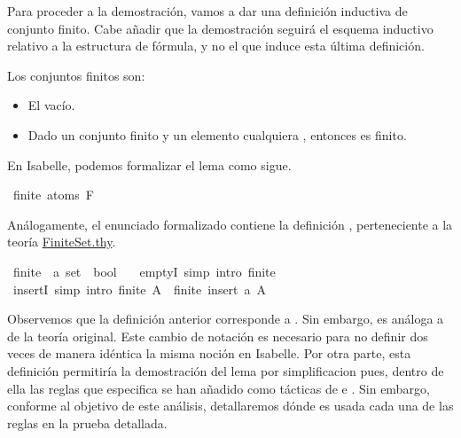 \begin{isabellebody}
\begin{isamarkuptext}
  Para proceder a la demostración, vamos a dar una definición inductiva 
  de conjunto finito. Cabe añadir que la demostración seguirá el esquema 
  inductivo relativo a la estructura de fórmula, y no el que induce esta
  última definición.

  \begin{definicion}
    Los conjuntos finitos son:
      \begin{itemize}
        \item El vacío.
        \item Dado un conjunto finito  y un elemento cualquiera , 
          entonces  es finito.
      \end{itemize}
  \end{definicion}

  En Isabelle, podemos formalizar el lema como sigue.%
\end{isamarkuptext}\isamarkuptrue%
\isamarkupfalse%
\ {\isachardoublequoteopen}finite\ {\isacharparenleft}atoms\ F{\isacharparenright}{\isachardoublequoteclose}\isanewline
%
\isadelimproof
\ \ %
\endisadelimproof
%
\isatagproof
{}\isamarkupfalse%
%
\endisatagproof
{\isafoldproof}%
%
\isadelimproof
%
\endisadelimproof
%
\begin{isamarkuptext}%
Análogamente, el enunciado formalizado contiene la definición 
  , perteneciente a la teoría 
  \href{https://n9.cl/x86r}{FiniteSet.thy}.%
\end{isamarkuptext}\isamarkuptrue%
\isamarkupfalse%
\ finite{\isacharprime}\ {\isacharcolon}{\isacharcolon}\ {\isachardoublequoteopen}{\isacharprime}a\ set\ {\isasymRightarrow}\ bool{\isachardoublequoteclose}\ \isanewline
\ \ emptyI{\isacharprime}\ {\isacharbrackleft}simp{\isacharcomma}\ intro{\isacharbang}{\isacharbrackright}{\isacharcolon}\ {\isachardoublequoteopen}finite{\isacharprime}\ {\isacharbraceleft}{\isacharbraceright}{\isachardoublequoteclose}\isanewline
{\isacharbar}\ insertI{\isacharprime}\ {\isacharbrackleft}simp{\isacharcomma}\ intro{\isacharbang}{\isacharbrackright}{\isacharcolon}\ {\isachardoublequoteopen}finite{\isacharprime}\ A\ {\isasymLongrightarrow}\ finite{\isacharprime}\ {\isacharparenleft}insert\ a\ A{\isacharparenright}{\isachardoublequoteclose}%
\begin{isamarkuptext}%
Observemos que la definición anterior corresponde a 
  . Sin embargo, es análoga a  de la 
  teoría original. Este cambio de notación es necesario para no definir 
  dos veces de manera idéntica la misma noción en Isabelle. Por otra 
  parte, esta definición permitiría la demostración del lema por 
  simplificacion pues, dentro de ella las reglas que especifica se han 
  añadido como tácticas de  e . Sin embargo, conforme al 
  objetivo de este análisis, detallaremos dónde es usada cada una de las 
  reglas en la prueba detallada. 


\end{isamarkuptext}
\end{isabellebody}

